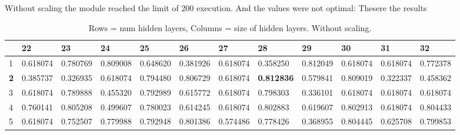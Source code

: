 \documentclass{article}
\begin{document}
Without scaling the module reached the limit of 200 execution. And the values
were not optimal: 
Thesere the results 

\begin{table}[]
\caption{Rows = num hidden layers, Columns = size of hidden layers. Without scaling.}
\label{tab:sklearn-NoScaling}
\begin{tabular}{|l|l|l|l|l|l|l|l|l|l|l|l|}
\hline
           & 22       & 23       & 24       & 25       & 26       & 27       & \textbf{28}       & 29       & 30       & 31       & 32       \\ \hline
1          & 0.618074 & 0.780769 & 0.809008 & 0.648620 & 0.381926 & 0.618074 & 0.358250          & 0.812049 & 0.618074 & 0.618074 & 0.772378 \\ \hline
\textbf{2} & 0.385737 & 0.326935 & 0.618074 & 0.794480 & 0.806729 & 0.618074 & \textbf{0.812836} & 0.579841 & 0.809019 & 0.322337 & 0.458362 \\ \hline
3          & 0.618074 & 0.789888 & 0.455320 & 0.792989 & 0.615772 & 0.618074 & 0.798303          & 0.336101 & 0.618074 & 0.618074 & 0.618074 \\ \hline
4          & 0.760141 & 0.805208 & 0.499607 & 0.780023 & 0.614245 & 0.618074 & 0.802883          & 0.619607 & 0.802913 & 0.618074 & 0.804433 \\ \hline
5          & 0.618074 & 0.752507 & 0.779988 & 0.792948 & 0.801386 & 0.574486 & 0.778426          & 0.368955 & 0.804445 & 0.625708 & 0.799853 \\ \hline
\end{tabular}
\end{table}
\end{document}

